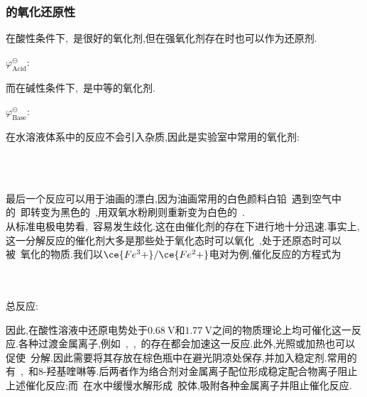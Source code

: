\documentclass{ctexbook}
\begin{document}
\subsubsection{的氧化还原性}
在酸性条件下,~是很好的氧化剂,但在强氧化剂存在时也可以作为还原剂.
\begin{tightcenter}
    $\varphi^\ominus_{\text{Acid}}$:\ \ \ 
\end{tightcenter}
而在碱性条件下,~是中等的氧化剂.
\begin{tightcenter}
    $\varphi^\ominus_{\text{Base}}$:\ \ \ 
\end{tightcenter}
在水溶液体系中的反应不会引入杂质,因此是实验室中常用的氧化剂:
\begin{tightcenter}
    \\
    \\
\end{tightcenter}
最后一个反应可以用于油画的漂白,因为油画常用的白色颜料白铅~遇到空气中的~即转变为黑色的~,用双氧水粉刷则重新变为白色的~.\\
\indent 从标准电极电势看,~容易发生歧化.这在由催化剂的存在下进行地十分迅速.事实上,这一分解反应的催化剂大多是那些处于氧化态时可以氧化~,处于还原态时可以被~氧化的物质.我们以$\ce{Fe^3+}/\ce{Fe^2+}$电对为例,催化反应的方程式为
\begin{tightcenter}
    \\
    \\
    总反应:~
\end{tightcenter}
因此,在酸性溶液中还原电势处于$\SI{0.68}{\volt}$和$\SI{1.77}{\volt}$之间的物质理论上均可催化这一反应.各种过渡金属离子,例如~,~,~的存在都会加速这一反应.此外,光照或加热也可以促使~分解.因此需要将其存放在棕色瓶中在避光阴凉处保存,并加入稳定剂.常用的有~,~和8-羟基喹啉等.后两者作为络合剂对金属离子配位形成稳定配合物离子阻止上述催化反应;而~在水中缓慢水解形成~胶体,吸附各种金属离子并阻止催化反应\cite{Lewis1960}.
\end{document}

